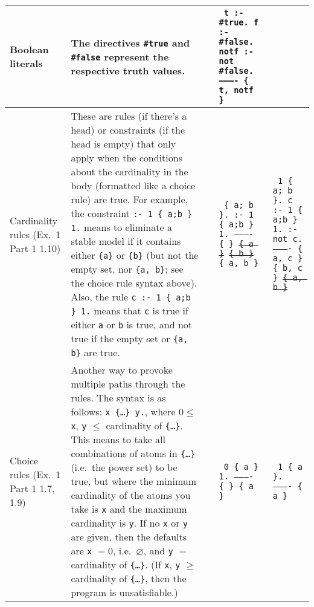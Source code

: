 \documentclass[9pt,a4paper,landscape]{article}
\begin{document}
{\begin{longtable}{Lp{14.5cm}lXX}
Boolean literals
& The directives \texttt{\#true} and \texttt{\#false} represent the respective truth values.
&& \texttt{%
	t :- \#true. \newline
	f :- \#false. \newline
	notf :- not \#false. \newline
	---------- \newline				
	\{ t, notf \} } &\\ \midrule

Cardinality rules \newline (Ex.\ 1 Part 1  1.10)
& These are rules (if there's a head) or constraints (if the head is empty) that only apply when the conditions about the cardinality in the body (formatted like a choice rule) are true.
For example, the constraint \texttt{:- 1 \{ a;b \} 1.} means to eliminate a stable model if it contains either \texttt{\{a\}} or \texttt{\{b\}} (but not the empty set, nor \texttt{\{a, b\}}; see the choice rule syntax above).		
Also, the rule \texttt{c :- 1 \{ a;b \} 1.} means that \texttt{c} is true if either \texttt{a} or \texttt{b} is true, and not true if the empty set or \texttt{\{a, b\}} are true.
&& \texttt{%
	\{ a; b \}. \newline
	:- 1 \{ a;b \} 1. \newline
	---------- \newline
	\{ \} \newline
	\sout{\{ a \}} \newline
	\sout{\{ b \}} \newline			
	\{ a, b \}}
& \texttt{%
	1 \{ a; b \}. \newline
	c :- 1 \{ a;b \} 1. \newline
	:- not c. \newline
	---------- \newline
	\{ a, c \} \newline
	\{ b, c \} \newline
	\sout{\{ a, b \}} } \\ \midrule		


Choice rules \newline (Ex.\ 1 Part 1  1.7, 1.9)
& Another way to provoke multiple paths through the rules.
The syntax is as follows: \newline \texttt{x \{\ldots \} y.}, where $0 \leq$ \texttt{x}, \texttt{y} $\leq$ cardinality of \texttt{\{\ldots \}}. 
This means to take all combinations of atoms in \texttt{\{\ldots \}} (i.e.\ the power set) to be true, but where the minimum cardinality of the atoms you take is \texttt{x} and the maximum cardinality is \texttt{y}. 
If no \texttt{x} or \texttt{y} are given, then the defaults are \texttt{x} $ = 0$, i.e.\ $\varnothing$, and \texttt{y} $=$ cardinality of \texttt{\{\ldots \}}.
(If \texttt{x}, \texttt{y} $\geq$ cardinality of \texttt{\{\ldots \}}, then the program is unsatisfiable.)
&& \texttt{%
	0 \{ a \} 1. \newline
	---------- \newline
	\{ \} \newline
	\{ a \} }
& \texttt{%
	1 \{ a \}. \newline
	---------- \newline
	\{ a \} }\\


\end{longtable}}
\end{document}
